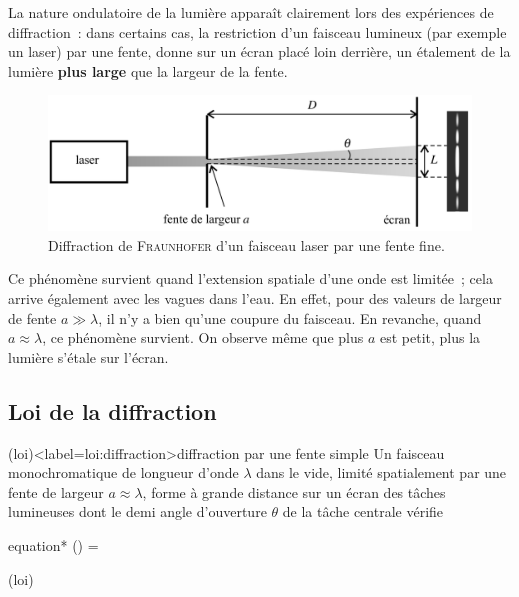 \documentclass[../../main/main.tex]{subfiles}
\begin{document}
La nature ondulatoire de la lumière apparaît clairement lors des expériences de
diffraction~: dans certains cas, la restriction d'un faisceau lumineux (par
exemple un laser) par une fente, donne sur un écran placé loin derrière, un
étalement de la lumière \textbf{plus large} que la largeur de la fente.

\begin{figure}[h]
	\centering
	\includegraphics[width=.8\linewidth]{ch1_fig5}
	\captionsetup{justification=centering}
	\caption{Diffraction de \textsc{Fraunhofer} d'un faisceau laser par une
		fente fine.}
	\label{fig:diff_las}
\end{figure}

Ce phénomène survient quand l'extension spatiale d'une onde est limitée~; cela
arrive également avec les vagues dans l'eau. En effet, pour des valeurs de
largeur de fente $a \gg \lambda$, il n'y a bien qu'une coupure du faisceau. En
revanche, quand $a \approx \lambda$, ce phénomène survient. On observe même que
plus $a$ est petit, plus la lumière s'étale sur l'écran.

\subsection{Loi de la diffraction}

\begin{tcb}(loi)<label=loi:diffraction>{diffraction par une fente simple}
	Un faisceau monochromatique de longueur d'onde $\lambda$ dans le vide,
	limité spatialement par une fente de largeur $a \approx \lambda$, forme à
	grande distance sur un écran des tâches lumineuses dont le demi angle
	d'ouverture $\theta$ de la tâche centrale vérifie
	\begin{empheq}[box=\fbox]{equation*}
		\sin(\theta) = 
	\end{empheq}
\end{tcb}(loi)

\end{document}
